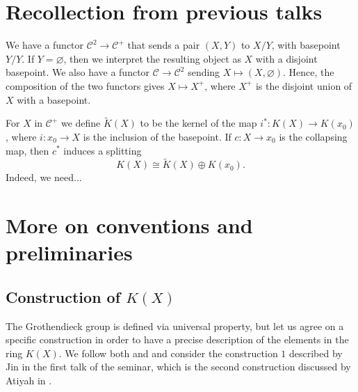 \documentclass[12pt,a4paper]{amsart}
\theoremstyle{plain}
\theoremstyle{definition}
\theoremstyle{remark}
\begin{document}
\section{Recollection from previous talks}

We have a functor $\mathcal{C}^{2} \to \mathcal{C}^{+}$ that sends a pair $(X,Y)$ to $X/Y$, with basepoint $Y/Y$.
If $Y = \varnothing$, then we interpret the resulting object as $X$ with a disjoint basepoint.
We also have a functor $\mathcal{C} \to \mathcal{C}^{2}$ sending $X \mapsto (X, \varnothing)$.
Hence, the composition of the two functors gives $X \mapsto X^{+}$, where $X^{+}$ is the disjoint union of $X$ with a basepoint.

For $X$ in $\mathcal{C}^{+}$ we define $\tilde{K}(X)$ to be the kernel of the map $i^{*} \colon K(X) \to K(x_{0})$, where $i \colon x_{0} \to X$ is the inclusion of the basepoint.
If $c \colon X \to x_{0}$ is the collapsing map, then $c^{*}$ induces a splitting
\[ K(X) \cong \tilde{K}(X) \oplus K(x_{0}). \]
Indeed, we need...

\appendix

\section{More on conventions and preliminaries}

\subsection{Construction of $K(X)$}

The Grothendieck group is defined via universal property, but let us agree on a specific construction in order to have a precise description of the elements in the ring $K(X)$.
We follow both \cite{ati67} and \cite{hat03} and consider the construction $1$ described by Jin in the first talk of the seminar, which is the second construction discussed by Atiyah in \cite[p.~42]{ati67}.
\end{document}
